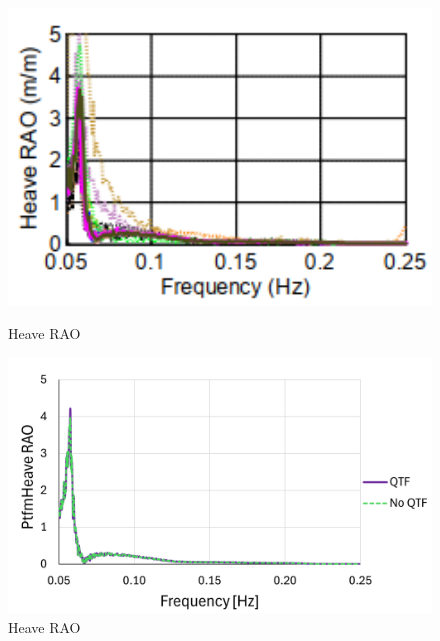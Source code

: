 \documentclass[a4paper, 11pt]{article}
\begin{document}
\begin{figure}[H]
    \begin{minipage}{0.48\textwidth}
        \centering
        \includegraphics[width=1\textwidth]{2.6_heave.png}
        \caption{\small Heave RAO \cite{Robertson2014}}
        \label{fig:2.6_heave}
    \end{minipage}
    \hfill
    \begin{minipage}{0.5\textwidth}
        \centering
        \includegraphics[width=1\textwidth]{2.6_heave_mine.png}
        \caption{\small Heave RAO} 
        \label{fig:2.6_heave_mine}
    \end{minipage}
\end{figure}
\end{document}
